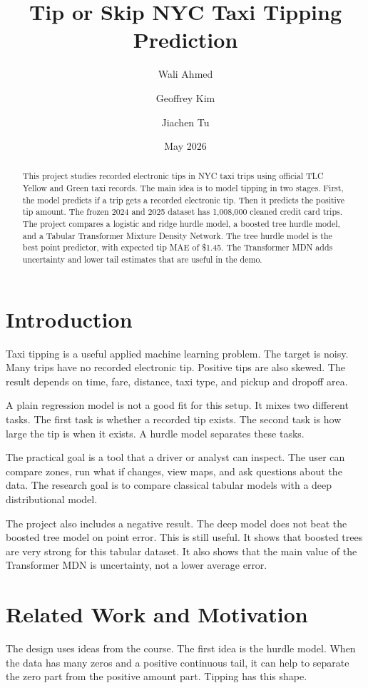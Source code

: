 \documentclass[11pt]{article}
\title{Tip or Skip NYC Taxi Tipping Prediction}
\author{Wali Ahmed \and Geoffrey Kim \and Jiachen Tu}
\date{May 2026}
\begin{document}
\maketitle

\begin{abstract}
This project studies recorded electronic tips in NYC taxi trips using official TLC Yellow and Green taxi records. The main idea is to model tipping in two stages. First, the model predicts if a trip gets a recorded electronic tip. Then it predicts the positive tip amount. The frozen 2024 and 2025 dataset has 1,008,000 cleaned credit card trips. The project compares a logistic and ridge hurdle model, a boosted tree hurdle model, and a Tabular Transformer Mixture Density Network. The tree hurdle model is the best point predictor, with expected tip MAE of \$1.45. The Transformer MDN adds uncertainty and lower tail estimates that are useful in the demo.
\end{abstract}

\section{Introduction}
Taxi tipping is a useful applied machine learning problem. The target is noisy. Many trips have no recorded electronic tip. Positive tips are also skewed. The result depends on time, fare, distance, taxi type, and pickup and dropoff area.

A plain regression model is not a good fit for this setup. It mixes two different tasks. The first task is whether a recorded tip exists. The second task is how large the tip is when it exists. A hurdle model separates these tasks.

The practical goal is a tool that a driver or analyst can inspect. The user can compare zones, run what if changes, view maps, and ask questions about the data. The research goal is to compare classical tabular models with a deep distributional model.

The project also includes a negative result. The deep model does not beat the boosted tree model on point error. This is still useful. It shows that boosted trees are very strong for this tabular dataset. It also shows that the main value of the Transformer MDN is uncertainty, not a lower average error.

\section{Related Work and Motivation}
The design uses ideas from the course. The first idea is the hurdle model. When the data has many zeros and a positive continuous tail, it can help to separate the zero part from the positive amount part. Tipping has this shape.
\end{document}
